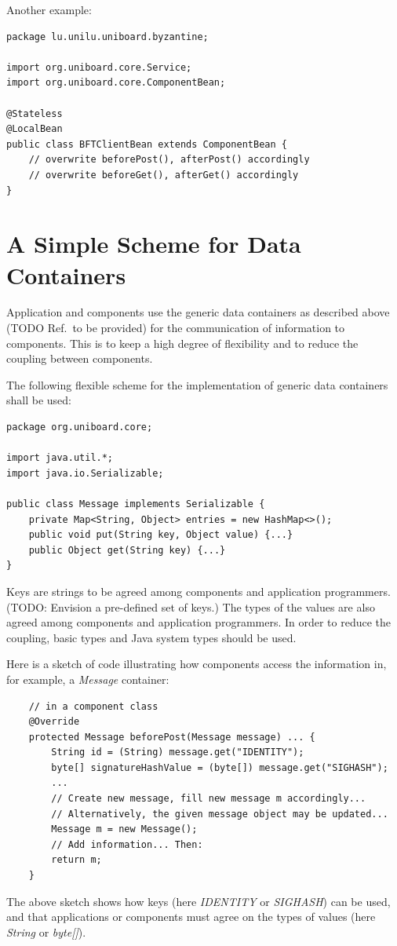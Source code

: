\documentclass[oneside]{scrreprt}
\begin{document}
Another example:

\begin{lstlisting}
package lu.unilu.uniboard.byzantine;

import org.uniboard.core.Service;
import org.uniboard.core.ComponentBean;

@Stateless
@LocalBean
public class BFTClientBean extends ComponentBean {
    // overwrite beforePost(), afterPost() accordingly
    // overwrite beforeGet(), afterGet() accordingly
}
\end{lstlisting}


\section{A Simple Scheme for Data Containers}

Application and components use the generic data containers
as described above (TODO Ref.\ to be provided) for the
communication of information to components. This is to keep a high
degree of flexibility and to reduce the coupling between
components.

The following flexible scheme for the implementation of generic
data containers shall be used:

\begin{lstlisting}
package org.uniboard.core;

import java.util.*;
import java.io.Serializable;

public class Message implements Serializable {
    private Map<String, Object> entries = new HashMap<>();
    public void put(String key, Object value) {...}
    public Object get(String key) {...}
}
\end{lstlisting}

Keys are strings to be agreed among components and application
programmers. (TODO: Envision a pre-defined set of keys.)
The types of the values are also
agreed among components and application programmers.
In order to reduce the
coupling, basic types and Java system types should be used.

Here is a sketch of code illustrating how components access
the information in, for example, a \emph{Message} container:

\begin{lstlisting}
    // in a component class
    @Override
    protected Message beforePost(Message message) ... {
        String id = (String) message.get("IDENTITY");
        byte[] signatureHashValue = (byte[]) message.get("SIGHASH");
        ...
        // Create new message, fill new message m accordingly...
        // Alternatively, the given message object may be updated...
        Message m = new Message();
        // Add information... Then:
        return m;
    }
\end{lstlisting}

The above sketch shows how keys (here \emph{IDENTITY} or \emph{SIGHASH})
can be used, and that applications or components must agree on
the types of values (here \emph{String} or \emph{byte[]}).

 
\end{document}
